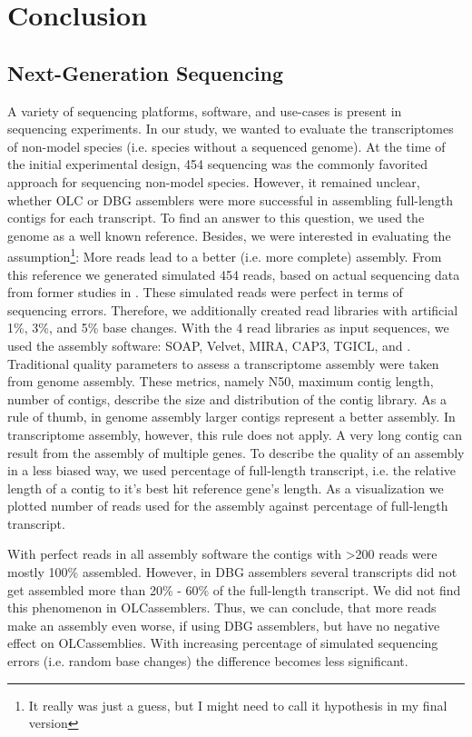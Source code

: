 \chapter{Conclusion}
 \section{Next-Generation Sequencing}
	A variety of sequencing platforms, software, and use-cases is present in sequencing experiments.
	In our study, we wanted to evaluate the transcriptomes of non-model species (i.e. species without a sequenced genome).
	At the time of the initial experimental design, 454 sequencing was the commonly favorited approach for sequencing non-model species.
	However, it remained unclear, whether \ac{OLC} or \ac{DBG} assemblers were more successful in assembling full-length contigs for each transcript.
	To find an answer to this question, we used the  genome as a well known reference.
	Besides, we were interested in evaluating the assumption\footnote{It really was just a guess, but I might need to call it hypothesis in my final version}: More reads lead to a better (i.e. more complete) assembly.
	From this reference we generated simulated 454 reads, based on actual sequencing data from former studies in  \cite{op_Braeutigam2010}.
	These simulated reads were perfect in terms of sequencing errors.
	Therefore, we additionally created read libraries with artificial 1\%, 3\%, and 5\% base changes.
	With the 4 read libraries as input sequences, we used the assembly software: SOAP\cite{unknown}, Velvet\cite{unknown}, MIRA\cite{unknown}, CAP3\cite{unknown}, TGICL\cite{unknown}, and \cite{CLC}.
	Traditional quality parameters to assess a  transcriptome assembly were taken from genome assembly.
	These metrics, namely N50, maximum contig length, number of contigs, describe the size and distribution of the contig library.
	As a rule of thumb, in genome assembly larger contigs represent a better assembly.
	In transcriptome assembly, however, this rule does not apply.
	A very long contig can result from the assembly of multiple genes.
	To describe the quality of an assembly in a less biased way, we used percentage of full-length transcript, i.e. the relative length of a contig to it's best hit reference gene's length.
	As a visualization we plotted number of reads used for the assembly against percentage of full-length transcript.
	
	With perfect reads in all assembly software the contigs with >200 reads were mostly 100\% assembled.
	However, in \ac{DBG} assemblers several transcripts did not get assembled more than 20\% - 60\% of the full-length transcript.
	We did not find this phenomenon in \ac{OLC}assemblers.
	Thus, we can conclude, that more reads make an assembly even worse, if using \ac{DBG} assemblers, but have no negative effect on \ac{OLC}assemblies.
	With increasing percentage of simulated sequencing errors (i.e. random base changes) the difference becomes less significant.
	
